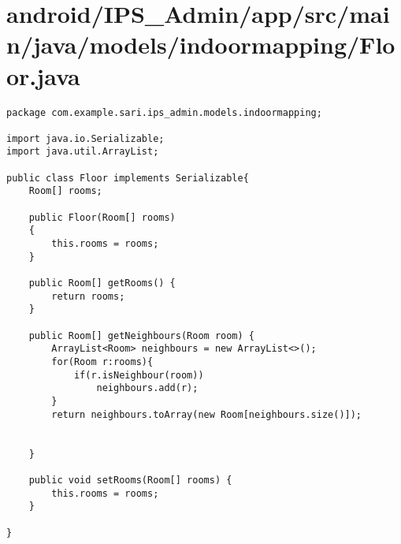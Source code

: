 \section{android/IPS\_Admin/app/src/main/java/models/indoormapping/Floor.java}
\begin{lstlisting}package com.example.sari.ips_admin.models.indoormapping;

import java.io.Serializable;
import java.util.ArrayList;

public class Floor implements Serializable{
    Room[] rooms;

    public Floor(Room[] rooms)
    {
        this.rooms = rooms;
    }

    public Room[] getRooms() {
        return rooms;
    }

    public Room[] getNeighbours(Room room) {
        ArrayList<Room> neighbours = new ArrayList<>();
        for(Room r:rooms){
            if(r.isNeighbour(room))
                neighbours.add(r);
        }
        return neighbours.toArray(new Room[neighbours.size()]);


    }

    public void setRooms(Room[] rooms) {
        this.rooms = rooms;
    }

}
\end{lstlisting}
\newpage
